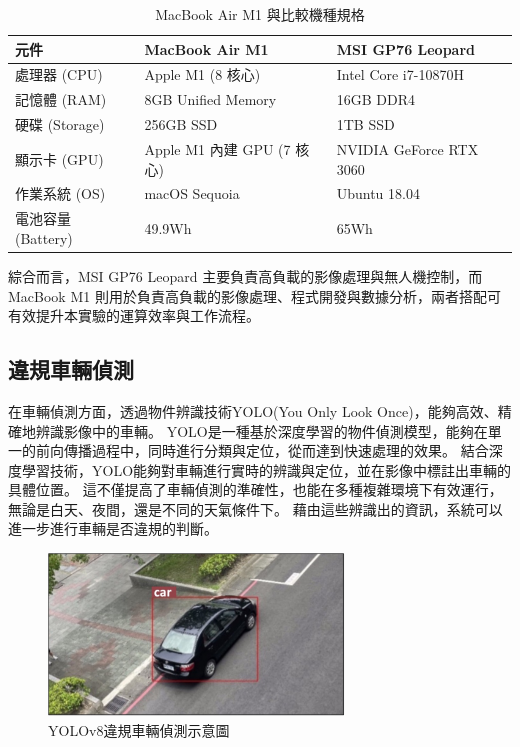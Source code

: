 \documentclass[12pt]{article}       %
\begin{document}
\begin{table}[H]
    \centering
    \caption{MacBook Air M1 與比較機種規格}
    \vspace{6pt} %
    \label{tab:macbook_m1}
    \begin{tabular}{lll}
        \toprule
        \textbf{元件} & \textbf{MacBook Air M1} & \textbf{MSI GP76 Leopard} \\
        \midrule
        處理器 (CPU)  & Apple M1 (8 核心) & Intel\textregistered{} Core\texttrademark{} i7-10870H \\
        記憶體 (RAM)  & 8GB Unified Memory & 16GB DDR4 \\
        硬碟 (Storage) & 256GB SSD  & 1TB SSD \\
        顯示卡 (GPU)  & Apple M1 內建 GPU (7 核心) & NVIDIA\textregistered{} GeForce\textregistered{} RTX 3060 \\
        作業系統 (OS)  & macOS Sequoia & Ubuntu 18.04 \\
        電池容量 (Battery) & 49.9Wh & 65Wh \\
        \bottomrule
    \end{tabular}
\end{table}

綜合而言，MSI GP76 Leopard 主要負責高負載的影像處理與無人機控制，而 MacBook M1 則用於負責高負載的影像處理、程式開發與數據分析，兩者搭配可有效提升本實驗的運算效率與工作流程。

\subsection{違規車輛偵測}
\hspace{2em}在車輛偵測方面，透過物件辨識技術YOLO(You Only Look Once)，能夠高效、精確地辨識影像中的車輛。
YOLO是一種基於深度學習的物件偵測模型，能夠在單一的前向傳播過程中，同時進行分類與定位，從而達到快速處理的效果。
結合深度學習技術，YOLO能夠對車輛進行實時的辨識與定位，並在影像中標註出車輛的具體位置。
這不僅提高了車輛偵測的準確性，也能在多種複雜環境下有效運行，無論是白天、夜間，還是不同的天氣條件下。
藉由這些辨識出的資訊，系統可以進一步進行車輛是否違規的判斷。
\begin{figure}[H]
    \centering
    \includegraphics[width=0.7\textwidth]{yolov7car.jpg}     %
    \caption{YOLOv8違規車輛偵測示意圖}    %
    \label{fig:yolov7car}    %
\end{figure}
\end{document}

